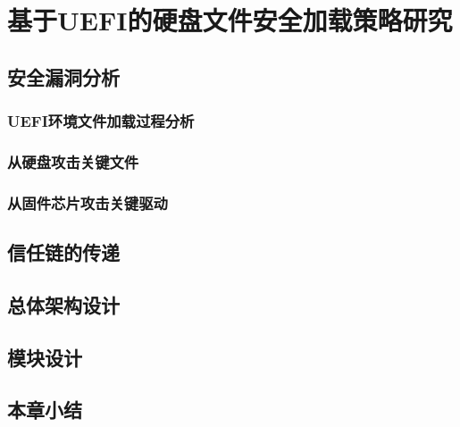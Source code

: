 %
%
\chapter{基于UEFI的硬盘文件安全加载策略研究}
\label{cha:architecture}

%
%
\section{安全漏洞分析}

\subsection{UEFI环境文件加载过程分析}

\subsection{从硬盘攻击关键文件}

\subsection{从固件芯片攻击关键驱动}
%
%
\section{信任链的传递}

%
%
\section{总体架构设计}

%
%
\section{模块设计}

%
%
\section{本章小结}


